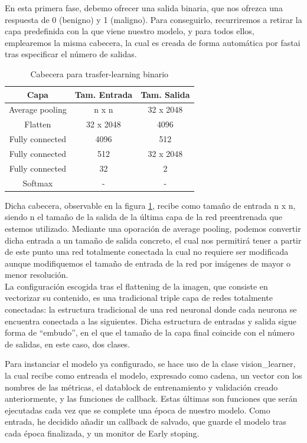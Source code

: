 En esta primera fase, debemo ofrecer una salida binaria, que nos ofrezca una respuesta de 0 (benigno) y 1 (maligno). Para conseguirlo, recurriremos a retirar la capa predefinida con la que viene nuestro modelo, y para todos ellos, emplearemos la misma cabecera, la cual es creada de forma automática por fastai tras especificar el número de salidas.

\begin{table}[H]
	\centering
	\caption{Cabecera para trasfer-learning binario}
	\begin{tabular}{|c|c|c|}
		\hline
		\textbf{Capa} & \textbf{Tam. Entrada} & \textbf{Tam. Salida} \\ \hline
		Average pooling & n x n & 32 x 2048 \\ \hline
		Flatten & 32 x 2048 & 4096 \\ \hline
		Fully connected & 4096 & 512 \\ \hline
		Fully connected & 512 & 32 x 2048 \\ \hline
		Fully connected & 32 & 2 \\ \hline
		Softmax & - & - \\ \hline
	\end{tabular}
	\label{header}
\end{table}

Dicha cabecera, observable en la figura \ref{header}, recibe como tamaño de entrada n x n, siendo n el tamaño de la salida de la última capa de la red preentrenada que estemos utilizado. Mediante una oporación de average pooling, podemos convertir dicha entrada a un tamaño de salida concreto, el cual nos permitirá tener a partir de este punto una red totalmente conectada la cual no requiere ser modificada aunque modifiquemos el tamaño de entrada de la red por imágenes de mayor o menor resolución. \\

La configuración escogida tras el flattening de la imagen, que consiste en vectorizar su contenido, es una tradicional triple capa de redes totalmente conectadas: la estructura tradicional de una red neuronal donde cada neurona se encuentra conectada a las siguientes. Dicha estructura de entradas y salida sigue forma de ``embudo'', en el que el tamaño de la capa final coincide con el  número de salidas, en este caso, dos clases.

Para instanciar el modelo ya configurado, se hace uso de la clase vision\_learner, la cual recibe como entreada el modelo, expresado como cadena, un vector con los nombres de las métricas, el datablock de entrenamiento y validación creado anteriormente, y las funciones de callback. Estas últimas son funciones que serán ejecutadas cada vez que se complete una época de nuestro modelo. Como entrada, he decidido añadir un callback de salvado, que guarde el modelo tras cada época finalizada, y un monitor de Early stoping.

